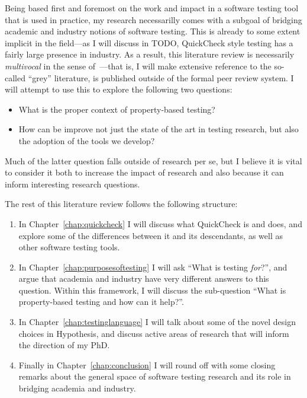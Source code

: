 Being based first and foremost on the work and impact in a software testing tool that is used in practice,
my research necessarilly comes with a subgoal of bridging academic and industry notions of software testing.
This is already to some extent implicit in the field---as
I will discuss in TODO,
QuickCheck style testing has a fairly large presence in industry.
As a result,
this literature review is necessarily \emph{multivocal} in the sense of~\cite{DBLP:conf/ease/GarousiFM16}---that is,
I will make extensive reference to the so-called ``grey'' literature,
is published outside of the formal peer review system.
I will attempt to use this to explore the following two questions:

\begin{itemize}
\item What is the proper context of property-based testing?
\item How can be improve not just the state of the art in testing research,
but also the adoption of the tools we develop?
\end{itemize}

Much of the latter question falls outside of research per se,
but I believe it is vital to consider it both to increase the impact of research and also because it can inform interesting research questions.

The rest of this literature review follows the following structure:

\begin{enumerate}
\item In Chapter~\ref{chap:quickcheck} I will discuss what QuickCheck is and does,
and explore some of the differences between it and its descendants,
as well as other software testing tools.
\item In Chapter~\ref{chap:purposesoftesting} I will ask ``What is testing \emph{for}?'',
and argue that academia and industry have very different answers to this question.
Within this framework, I will discuss the sub-question ``What is property-based testing and how can it help?''.
\item In Chapter~\ref{chap:testinglanguage} I will talk about some of the novel design choices in Hypothesis,
and discuss active areas of research that will inform the direction of my PhD.
\item Finally in Chapter~\ref{chap:conclusion} I will round off with some closing remarks about the general space of software testing research and its role in bridging academia and industry.
\end{enumerate}

